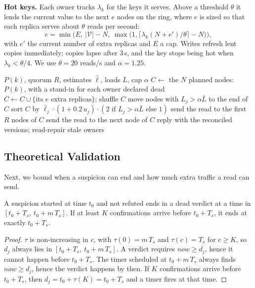 \documentclass[sigconf,nonacm]{acmart}
\begin{document}
\textbf{Hot keys.} Each owner tracks $\lambda_k$ for the keys it serves. Above a threshold $\theta$ it lends the current value to the next $e$ nodes on the ring, where $e$ is sized so that each replica serves about $\theta$ reads per second:
\begin{equation}
e = \min\!\Big(E,\ |\mathcal{V}|-N,\ \max\!\big(1, \big\lceil \lambda_k (N+e')/\theta \big\rceil - N\big)\Big),
\end{equation}
with $e'$ the current number of extra replicas and $E$ a cap. Writes refresh lent copies immediately; copies lapse after 3\,s, and the key stops being hot when $\lambda_k < \theta/4$. We use $\theta = 20$ reads/s and $\alpha = 1.25$.

\begin{algorithm}[t]
\caption{Read of key $k$ at a coordinator}
\label{alg:read}
\begin{algorithmic}[1]
\Require $P(k)$, quorum $R$, estimates $\hat{\ell}$, loads $L$, cap $\alpha$
\State $C \gets$ the $N$ planned nodes: $P(k)$, with a stand-in for each owner declared dead
  \State $C \gets C \cup \{\text{its } e \text{ extra replicas}\}$; shuffle $C$
  \State move nodes with $L_j > \alpha\bar{L}$ to the end of $C$
\Else
  \State sort $C$ by $\hat{\ell}_j \cdot (1 + 0.2\,u_j) \cdot (2 \text{ if } L_j > \alpha\bar{L} \text{ else } 1)$ 
\EndIf
\State send the read to the first $R$ nodes of $C$
    \State send the read to the next node of $C$ 
  \EndIf
\EndWhile
\State reply with the reconciled versions; read-repair stale owners
\end{algorithmic}
\end{algorithm}

\subsection{Theoretical Validation}

Next, we bound when a suspicion can end and how much extra traffic a read can send.

\begin{theorem}
A suspicion started at time $t_0$ and not refuted ends in a dead verdict at a time in $[t_0 + T_s,\ t_0 + m\,T_s]$. If at least $K$ confirmations arrive before $t_0 + T_s$, it ends at exactly $t_0 + T_s$.
\end{theorem}

\begin{proof}
$\tau$ is non-increasing in $c$, with $\tau(0) = m\,T_s$ and $\tau(c) = T_s$ for $c \ge K$, so $d_j$ always lies in $[t_0+T_s,\ t_0+m\,T_s]$. A verdict requires $now \ge d_j$, hence it cannot happen before $t_0 + T_s$. The timer scheduled at $t_0 + m\,T_s$ always finds $now \ge d_j$, hence the verdict happens by then. If $K$ confirmations arrive before $t_0 + T_s$, then $d_j = t_0 + \tau(K) = t_0 + T_s$ and a timer fires at that time.
\end{proof}
\end{document}
